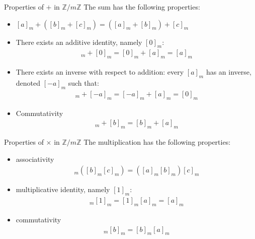 \begin{parag}{Properties of $+$ in $ \mathbb{Z} / m \mathbb{Z}$}
    The sum has the following properties:
    \begin{itemize}
        \item $[a]_m + ( [b]_m + [c]_m) = ([a]_m + [b]_m) + [c]_m$
        \item There exists an additive identity, namely $[0]_m$:
            \begin{align*}
                [a]_m + [0]_m = [0]_m + [a]_m = [a]_m
            \end{align*}
        \item There exists an inverse with respect to addition: every $[a]_m$ has an inverse, denoted $[-a]_m$ such that:
            \begin{align*}
                [a]_m + [-a]_m = [-a]_m + [a]_m = [0]_m
            \end{align*}
        \item Commutativity
            \begin{align*}
                [a]_m + [b]_m = [b]_m + [a]_m
            \end{align*}
    \end{itemize}

\end{parag}
\begin{parag}{Properties of $ \times$ in $ \mathbb{Z} / m \mathbb{Z}$}
    The multiplication has the following properties:
    \begin{itemize}
        \item associativity
            \begin{align*}
                [a]_m([b]_m[c]_m) = ([a]_m[b]_m)[c]_m
            \end{align*}
        \item multiplicative identity, namely $[1]_m$:
            \begin{align*}
                [a]_m [1]_m = [1]_m[a]_m = [a]_m
            \end{align*}
        \item commutativity
            \begin{align*}
                [a]_m[b]_m = [b]_m[a]_m
            \end{align*}
            
    \end{itemize}

\end{parag}


